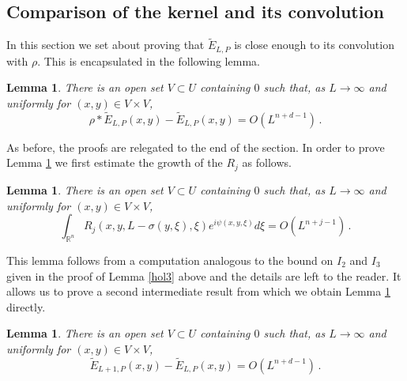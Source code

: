\documentclass[10pt,twoside]{article}
\newcommand{\R}{\mathbb{R}}
\numberwithin{theorem}{section}
\newtheorem{lemma}[theorem]{Lemma}
\begin{document}
\subsection{Comparison of the kernel and its convolution}

In this section we set about proving that $\tilde{E}_{L,P}$ is close enough to its convolution with $\rho$. This is encapsulated in the following lemma.
\begin{lemma}\label{hol6}
There is an open set $V\subset U$ containing $0$ such that, as $L\rightarrow\infty$ and uniformly for $(x,y)\in V\times V$,
\[\rho*\tilde{E}_{L,P}(x,y)-\tilde{E}_{L,P}(x,y)=O(L^{n+d-1})\,.\]
\end{lemma}
As before, the proofs are relegated to the end of the section. In order to prove Lemma \ref{hol6} we first estimate the growth of the $R_j$ as follows.
\begin{lemma}\label{hol2}
There is an open set $V\subset U$ containing $0$ such that, as $L\rightarrow\infty$ and uniformly for $(x,y)\in V\times V$,
\[\int_{\R^n} R_j(x,y,L-\sigma(y,\xi),\xi)e^{i\psi(x,y,\xi)}d\xi=O(L^{n+j-1})\,.\] 
\end{lemma}
This lemma follows from a computation analogous to the bound on $I_2$ and $I_3$ given in the proof of Lemma \ref{hol3} above and the details are left to the reader. It allows us to prove a second intermediate result from which we obtain Lemma \ref{hol6} directly.
\begin{lemma}\label{hol5}
There is an open set $V\subset U$ containing $0$ such that, as $L\rightarrow\infty$ and uniformly for $(x,y)\in V\times V$,
\[\tilde{E}_{L+1,P}(x,y)-\tilde{E}_{L,P}(x,y)=O(L^{n+d-1})\,.\]
\end{lemma}
\end{document}
